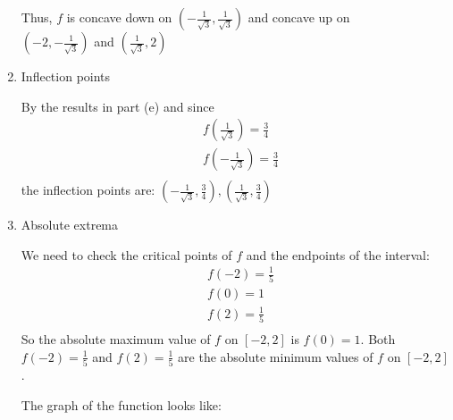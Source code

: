 \documentclass[nooutcomes,handout]{ximera}
\begin{document}
\begin{problem}
\begin{enumerate}
\begin{freeResponse}
\begin{center}
\begin{image}
\begin{tikzpicture}
\end{tikzpicture}
\end{image}
\end{center}


		
		
		Thus, $f$ is concave down on $\left( - \frac{1}{\sqrt{3}}, \frac{1}{\sqrt{3}} \right)$ and concave up on \\ 
		$\left( -2, - \frac{1}{\sqrt{3}} \right)$ and $\left( \frac{1}{\sqrt{3}}, 2 \right)$
		\end{freeResponse}
	\item  Inflection points
	
		\begin{freeResponse}
		By the results in part (e) and since
		\begin{align*}
 		 & f\left( \frac{1}{\sqrt{3}} \right)=\frac{3}{4} \\ 
 		& f\left( -\frac{1}{\sqrt{3}} \right)=\frac{3}{4} \\ 
		\end{align*}  
		the inflection points are: $\left( -\frac{1}{\sqrt{3}},\frac{3}{4} \right),\left( \frac{1}{\sqrt{3}},\frac{3}{4} \right)$
		\end{freeResponse}
	\item  Absolute extrema
	
		\begin{freeResponse}
		We need to check the critical points of $f$ and the endpoints of the interval:
		\begin{align*}
  		& f(-2)=\frac{1}{5} \\ 
 		& f(0)=1 \\ 
 		& f(2)=\frac{1}{5} \\ 
		\end{align*}
		So the absolute maximum value of $f$ on $[-2,2]$ is $f(0)=1$.  Both $f(-2)=\frac{1}{5}$ and $f(2)=\frac{1}{5}$ are the absolute minimum values of $f$ on $[-2,2]$.
		
		The graph of the function looks like:
		
\begin{center}
\begin{image}
\end{image}
\end{center}
\end{freeResponse}
\end{enumerate}
\end{problem}
\end{document}
